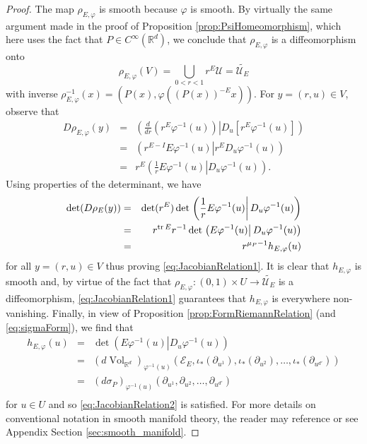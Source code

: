 \documentclass[11pt, letter]{book}
\renewcommand\det{\operatorname{det}}
\newcommand{\Vol}{\operatorname{Vol}}
\begin{document}
\begin{proof}
The map $\rho_{E,\varphi}$ is smooth because $\varphi$ is smooth. By virtually the same argument made in the proof of Proposition \ref{prop:PsiHomeomorphism}, which here uses the fact that $P\in C^\infty(\mathbb{R}^d)$, we conclude that $\rho_{E,\varphi}$ is a diffeomorphism onto 
\begin{equation*}\rho_{E,\varphi}(V)=\bigcup_{0<r<1}r^E\mathcal{U}=\widetilde{\mathcal{U}_E}
\end{equation*}
with inverse $\rho_{E,\varphi}^{-1}(x)=(P(x),\varphi((P(x))^{-E}x))$. For $y=(r,u)\in V$, observe that
\begin{eqnarray*}
D\rho_{E,\varphi}(y)&=&\left.\left(\frac{d}{dr}(r^E\varphi^{-1}(u)) \right\vert D_u\left[r^E\varphi^{-1}(u)\right]\right)\\
&=&\left.\left(r^{E-I}E\varphi^{-1}(u)\right\vert r^E D_u\varphi^{-1}(u)\right)\\
&=&r^E\left.\left(\frac{1}{r}E\varphi^{-1}(u)\right\vert D_u\varphi^{-1}(u)\right).
\end{eqnarray*}
Using properties of the determinant, we have
\begin{eqnarray*}
    \det(D\rho_E(y))&=&\det(r^E)\det\left.\left(\frac{1}{r}E\varphi^{-1}(u)\right\vert D_u\varphi^{-1}(u)\right)\\
    &=&r^{\tr E}r^{-1}\det\left.\left(E\varphi^{-1}(u)\right\vert D_u\varphi^{-1}(u)\right)\\
    &=&r^{\mu_P-1}h_{E,\varphi}(u)
\end{eqnarray*}
for all $y=(r,u)\in V$ thus proving \eqref{eq:JacobianRelation1}. It is clear that $h_{E,\varphi}$ is smooth and, by virtue of the fact that $\rho_{E,\varphi}:(0,1)\times U\to \widetilde{\mathcal{U}_E}$ is a diffeomorphism, \eqref{eq:JacobianRelation1} guarantees that $h_{E,\varphi}$ is everywhere non-vanishing. Finally, 
in view of Proposition \ref{prop:FormRiemannRelation} (and \eqref{eq:sigmaForm}), we find that
\begin{eqnarray*}
    h_{E,\varphi}(u)&=&
    \det\left.\left(E\varphi^{-1}(u)\right\vert D_u\varphi^{-1}(u)\right)\\ \nonumber
    &=&
    (d\Vol_{\mathbb{R}^d})_{\varphi^{-1}(u)}(\mathcal{E}_E,\iota_*(\partial_{u^1}),\iota_*(\partial_{u^2}),\dots,\iota_*(\partial_{u^{d'}}))\\ \nonumber
    &=&\left(d\sigma_P\right)_{\varphi^{-1}(u)}(\partial_{u^1},\partial_{u^2},\dots,\partial_{u^{d'}})\\
\end{eqnarray*}
for $u\in U$ and so \eqref{eq:JacobianRelation2} is satisfied. For more details on conventional notation in smooth manifold theory, the reader may reference \cite{lee_introduction_2003} or see Appendix Section \ref{sec:smooth_manifold}.
\end{proof}
\end{document}
